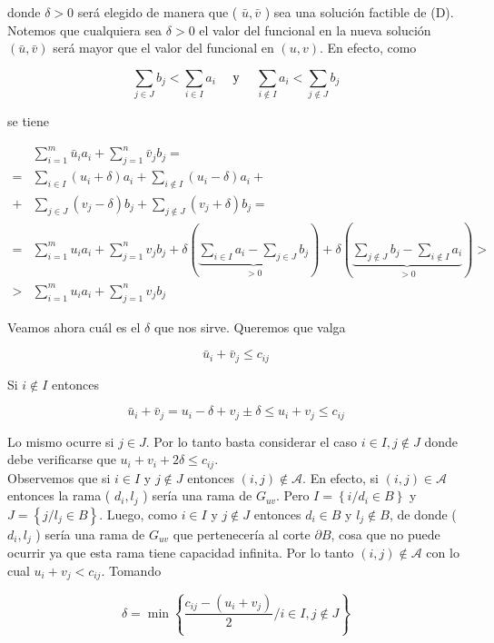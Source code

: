 \documentclass[10pt]{article}
\begin{document}
donde $\delta>0$ será elegido de manera que ( $\bar{u}, \bar{v}$ ) sea una solución factible de (D). Notemos que cualquiera sea $\delta>0$ el valor del funcional en la nueva solución $(\bar{u}, \bar{v})$ será mayor que el valor del funcional en $(u, v)$. En efecto, como

$$
\sum_{j \in J} b_{j}<\sum_{i \in I} a_{i} \quad \text { у } \quad \sum_{i \notin I} a_{i}<\sum_{j \notin J} b_{j}
$$

se tiene

$$
\begin{aligned}
& \sum_{i=1}^{m} \bar{u}_{i} a_{i}+\sum_{j=1}^{n} \bar{v}_{j} b_{j}= \\
= & \sum_{i \in I}\left(u_{i}+\delta\right) a_{i}+\sum_{i \notin I}\left(u_{i}-\delta\right) a_{i}+ \\
+ & \sum_{j \in J}\left(v_{j}-\delta\right) b_{j}+\sum_{j \notin J}\left(v_{j}+\delta\right) b_{j}= \\
= & \sum_{i=1}^{m} u_{i} a_{i}+\sum_{j=1}^{n} v_{j} b_{j}+\delta(\underbrace{\sum_{i \in I} a_{i}-\sum_{j \in J} b_{j}}_{>0})+\delta(\underbrace{\sum_{j \notin J} b_{j}-\sum_{i \notin I} a_{i}}_{>0})> \\
> & \sum_{i=1}^{m} u_{i} a_{i}+\sum_{j=1}^{n} v_{j} b_{j}
\end{aligned}
$$

Veamos ahora cuál es el $\delta$ que nos sirve. Queremos que valga

$$
\bar{u}_{i}+\bar{v}_{j} \leq c_{i j}
$$

Si $i \notin I$ entonces

$$
\bar{u}_{i}+\bar{v}_{j}=u_{i}-\delta+v_{j} \pm \delta \leq u_{i}+v_{j} \leq c_{i j}
$$

Lo mismo ocurre si $j \in J$. Por lo tanto basta considerar el caso $i \in I, j \notin J$ donde debe verificarse que $u_{i}+v_{i}+2 \delta \leq c_{i j}$.\\
Observemos que si $i \in I$ y $j \notin J$ entonces $(i, j) \notin \mathcal{A}$. En efecto, si $(i, j) \in \mathcal{A}$ entonces la rama ( $d_{i}, l_{j}$ ) sería una rama de $G_{u v}$. Pero $I=\left\{i / d_{i} \in B\right\}$ y $J=\left\{j / l_{j} \in B\right\}$. Luego, como $i \in I$ y $j \notin J$ entonces $d_{i} \in B$ y $l_{j} \notin B$, de donde ( $d_{i}, l_{j}$ ) sería una rama de $G_{u v}$ que pertenecería al corte $\partial B$, cosa que no puede ocurrir ya que esta rama tiene capacidad infinita. Por lo tanto $(i, j) \notin \mathcal{A}$ con lo cual $u_{i}+v_{j}<c_{i j}$. Tomando

$$
\delta=\min \left\{\frac{c_{i j}-\left(u_{i}+v_{j}\right)}{2} / i \in I, j \notin J\right\}
$$
\end{document}
